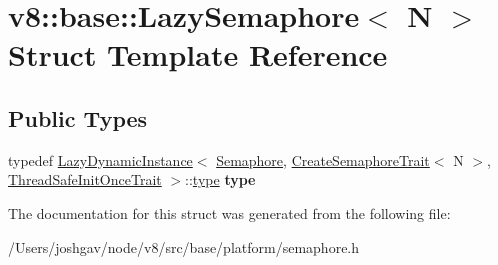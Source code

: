 \hypertarget{structv8_1_1base_1_1_lazy_semaphore}{}\section{v8\+:\+:base\+:\+:Lazy\+Semaphore$<$ N $>$ Struct Template Reference}
\label{structv8_1_1base_1_1_lazy_semaphore}
\subsection*{Public Types}
\begin{DoxyCompactItemize}
\item 
typedef \hyperlink{structv8_1_1base_1_1_lazy_dynamic_instance}{Lazy\+Dynamic\+Instance}$<$ \hyperlink{classv8_1_1base_1_1_semaphore}{Semaphore}, \hyperlink{structv8_1_1base_1_1_create_semaphore_trait}{Create\+Semaphore\+Trait}$<$ N $>$, \hyperlink{structv8_1_1base_1_1_thread_safe_init_once_trait}{Thread\+Safe\+Init\+Once\+Trait} $>$\+::\hyperlink{structv8_1_1base_1_1_lazy_instance_impl}{type} {\bfseries type}\hypertarget{structv8_1_1base_1_1_lazy_semaphore_a18fcc8e9b93da4e0d3efc225a74f9668}{}\label{structv8_1_1base_1_1_lazy_semaphore_a18fcc8e9b93da4e0d3efc225a74f9668}

\end{DoxyCompactItemize}


The documentation for this struct was generated from the following file\+:\begin{DoxyCompactItemize}
\item 
/\+Users/joshgav/node/v8/src/base/platform/semaphore.\+h\end{DoxyCompactItemize}
